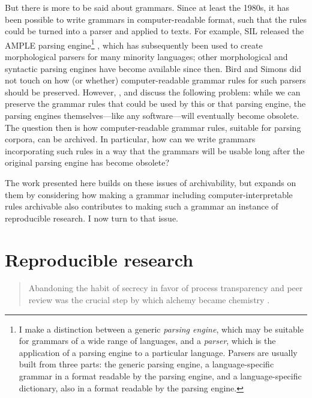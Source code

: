 But there is more to be said about grammars. Since at least the 1980s, it has been possible to write grammars in computer-readable format, such that the rules could be turned into a parser and applied to texts. For example, SIL released the AMPLE parsing engine\footnote{I
  make a distinction between a generic {\textit{parsing engine}}, which may be suitable for grammars of a wide range of languages, and a {\textit{parser}}, which is the application of a parsing engine to a particular language. Parsers are usually built from three parts: the generic parsing engine, a language-specific grammar in a format readable by the parsing engine, and a language-specific dictionary, also in a format readable by the parsing engine.
}
\citep{WeberEtAl1988}, which has subsequently been used to create morphological parsers for many minority languages; other morphological and syntactic parsing engines have become available since then. Bird and Simons did not touch on how (or whether) computer-readable grammar rules for such parsers should be preserved. However, \citet{AmithEtAl2005}, \citet{MaxwellEtAl2005} and \citet{MaxwellEtAl2008} discuss the following problem: while we can preserve the grammar rules that could be used by this or that parsing engine, the parsing engines themselves---like any software---will eventually become obsolete. The question then is how computer-readable grammar rules, suitable for parsing corpora, can be archived. In particular, how can we write grammars incorporating such rules in a way that the grammars will be usable long after the original parsing engine has become obsolete?

The work presented here builds on these issues of archivability, but expands on them by considering how making a grammar including computer-interpretable rules archivable also contributes to making such a grammar an instance of reproducible research. I now turn to that issue.

\section{Reproducible research}
\begin{quote}
  Abandoning the habit of secrecy in favor of process transparency and peer review was the crucial step by which alchemy became chemistry \citep{Raymond2004}.
\end{quote}

